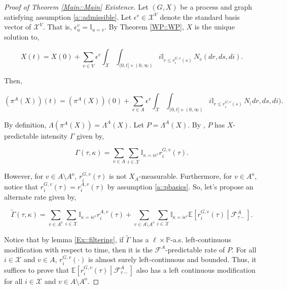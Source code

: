 \documentclass[12pt]{article}
\newcommand{\mb}{\mathbb}
\newcommand{\mc}{\mathcal}
\newcommand{\ep}{\epsilon}
\newcommand{\pr}{\mb{P}}							%
\newcommand{\ex}[1]{\mb{E}\left[#1\right]}			%
\newcommand{\sta}{\mc{X}}							%
\newcommand{\Xf}{X}									%
\newcommand{\poiss}{N}								%
\newcommand{\Sm}{\ell}								%
\newcommand{\rate}{r}								%
\newcommand{\F}{\mc{F}}								%
\newcommand{\proj}{\pi}								%
\newcommand{\poissv}[1]{_{#1}}						%
\newcommand{\vind}[1]{_{#1}}						%
\newcommand{\tme}[1]{(#1)}							%
\newcommand{\vpara}[1]{^{#1}}						%
\newcommand{\stpara}[1]{_{#1}}						%
\newcommand{\tpara}[1]{_{#1}}						%
\newcommand{\gvpara}[2]{^{#1,#2}}					%
\newcommand{\inte}[1]{{#1}^\mathrm{o}}				%
\newcommand{\alt}[1]{\tilde{#1}}					%
\newcommand{\pmap}{\Lambda}							%
\newcommand{\rt}{\tau}								%
\renewcommand{\mark}{\kappa}						%
\newcommand{\ratee}{\Gamma}							%
\newcommand{\rp}{P}									%
\newcommand{\ev}[1]{\ep^{#1}}						%
\begin{document}
\begin{proof}[Proof of Theorem \ref{Main::Main} Existence]

Let \((G,\Xf)\) be a process and graph satisfying assumption \ref{a::admissible}. Let \(\ev{v} \in \sta^V\) denote the standard basis vector of \(\sta^V\). That is, \(\ev{v}\vind{u} = \mb{I}_{u=v}\). By Theorem \ref{WP::WP}, \(\Xf\) is the unique solution to,

\[\Xf\tme{t} = \Xf\tme{0} + \sum_{v \in V}\ev{v}\int_\sta\int_{(0,t]\times (0,\infty)} i\mb{I}_{r \leq \rate\gvpara{G}{v}\stpara{i}\tme{s}}\,\poiss\poissv{v}(dr,ds,di).\]

Then,

\[\left(\proj\vpara{A}(\Xf)\right)\tme{t} = \left(\proj\vpara{A}(\Xf)\right)\tme{0} + \sum_{v\in A}\ev{v}\int_\sta\int_{(0,t]\times (0,\infty)} i\mb{I}_{r \leq \rate\gvpara{G}{v}\stpara{i}\tme{s}}\,\poiss\poissv(dr,ds,di).\]

By definition, \(\pmap\left(\proj\vpara{A}(\Xf)\right) = \pmap\vpara{A}(\Xf)\). Let \(\rp = \pmap\vpara{A}(\Xf)\). By \cite[Exercise 14.7.1]{DalVer08}, \(\rp\) has \(\Xf\)-predictable intensity \(\ratee\) given by,

\[\ratee(\rt,\mark) = \sum_{v \in A} \sum_{i \in \sta} \mb{I}_{\mark = i\ev{v}} \rate\gvpara{G}{v}\stpara{i}\tme{\rt}.\]

However, for \(v \in A\setminus \inte{A}\), \(\rate\gvpara{G}{v}\stpara{i}\tme{\rt}\) is not \(\Xf\vind{A}\)-measurable. Furthermore, for \(v \in \inte{A}\), notice that \(\rate\gvpara{G}{v}\stpara{i}\tme{\rt} = \rate\gvpara{A}{v}\stpara{i}\tme{\rt}\) by assumption \ref{a::pbasics}. So, let's propose an alternate rate given by,

\begin{equation}
\alt{\ratee}(\rt,\mark) = \sum_{v \in \inte{A}}\sum_{i\in \sta} \mb{I}_{\mark = i\ev{v}}\rate\gvpara{A}{v}\stpara{i}\tme{\rt} + \sum_{v \in A\setminus \inte{A}}\sum_{i \in \sta} \mb{I}_{\mark = i\ev{v}}\ex{\rate\gvpara{G}{v}\stpara{i}\tme{\rt}\middle|\F\vpara{A}\tpara{\rt-}}.
\label{Ex::tempfiltrate}
\end{equation}

Notice that by lemma \ref{Ex::filtering}, if \(\alt{\ratee}\) has a \(\Sm\times \pr\)-a.s. left-continuous modification with respect to time, then it is the \(\F\vpara{A}\)-predictable rate of \(\rp\). For all \(i\in\sta\) and \(v \in A\), \(\rate\gvpara{G}{v}\stpara{i}\tme{\cdot}\) is almost surely left-continuous and bounded. Thus, it suffices to prove that \(\ex{\rate\gvpara{G}{v}\stpara{i}(\rt)\middle|\F\vpara{A}\tpara{\rt-}}\) also has a left continuous modification for all \(i\in \sta\) and \(v \in A\setminus\inte{A}\).


\end{proof}
\end{document}
